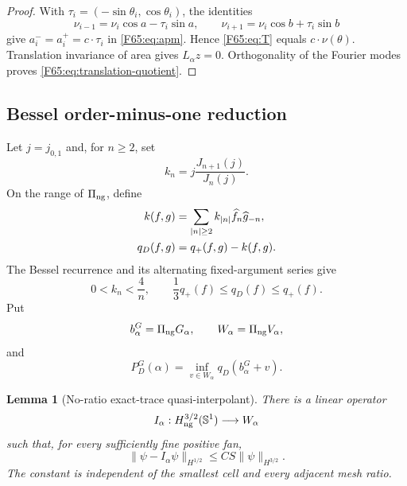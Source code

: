 \documentclass[11pt]{amsart}
\numberwithin{equation}{section}
\newtheorem{lemma}[theorem]{Lemma}
\theoremstyle{definition}
\theoremstyle{remark}
\newcommand{\Sone}{\mathbb S^1}
\newcommand{\PiNG}{\Pi_{\rm ng}}
\newcommand{\qplus}{q_+}
\newcommand{\qdisk}{q_D}
\begin{document}
\begin{proof}
With $\tau_i=(-\sin\theta_i,\cos\theta_i)$, the identities
\begin{equation}
 \nu_{i-1}=\nu_i\cos a-\tau_i\sin a,
 \qquad
 \nu_{i+1}=\nu_i\cos b+\tau_i\sin b
\end{equation}
give $a_i^-=a_i^+=c\cdot\tau_i$ in \eqref{F65:eq:apm}.  Hence
\eqref{F65:eq:T} equals $c\cdot\nu(\theta)$.  Translation invariance of area
gives $L_\alpha z=0$.  Orthogonality of the Fourier modes proves
\eqref{F65:eq:translation-quotient}.
\end{proof}

\subsection{Bessel order-minus-one reduction}

Let $j=j_{0,1}$ and, for $n\ge2$, set
\begin{equation}
 k_n=j\frac{J_{n+1}(j)}{J_n(j)}.
\end{equation}
On the range of $\PiNG$, define
\begin{align}
 k(f,g)&=\sum_{|n|\ge2}k_{|n|}\widehat f_n\widehat g_{-n},\notag\\
 \qdisk(f,g)&=\qplus(f,g)-k(f,g).
 \label{F65:eq:qdisk}
\end{align}
The Bessel recurrence and its alternating fixed-argument series give
\begin{equation}\label{F65:eq:bessel-bounds}
 0<k_n<\frac4n,
 \qquad \frac13\qplus(f)\le\qdisk(f)\le\qplus(f).
\end{equation}
Put
\begin{equation}
 b_\alpha^G=\PiNG G_\alpha,
 \qquad W_\alpha=\PiNG V_\alpha,
\end{equation}
and
\begin{equation}\label{F65:eq:PDG}
 P_D^G(\alpha)=\inf_{v\in W_\alpha}\qdisk(b_\alpha^G+v).
\end{equation}

\begin{lemma}[No-ratio exact-trace quasi-interpolant]
\label{F65:lem:QI}
There is a linear operator
\begin{equation}
 I_\alpha:H_{\rm ng}^{3/2}(\Sone)\longrightarrow W_\alpha
\end{equation}
such that, for every sufficiently fine positive fan,
\begin{equation}\label{F65:eq:interpolant}
 \|\psi-I_\alpha\psi\|_{H^{1/2}}
 \le CS\|\psi\|_{H^{3/2}}.
\end{equation}
The constant is independent of the smallest cell and every adjacent
mesh ratio.
\end{lemma}
\end{document}
